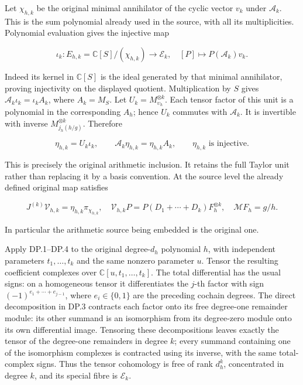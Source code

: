 \documentclass{article}
\begin{document}
Let \(\chi_{h,k}\) be the original minimal annihilator of the cyclic vector \(v_k\) under \(\mathcal A_k\). This is the sum polynomial already used in the source, with all its multiplicities. Polynomial evaluation gives the injective map

\[
\iota_k:E_{h,k}=\mathbb C[S]/(\chi_{h,k})\longrightarrow\mathcal E_k,
\quad [P]\longmapsto P(\mathcal A_k)v_k.
\tag{DP.25}
\]

Indeed its kernel in \(\mathbb C[S]\) is the ideal generated by that minimal annihilator, proving injectivity on the displayed quotient. Multiplication by \(S\) gives \(\mathcal A_k\iota_k=\iota_k A_k\), where \(A_k=M_S\). Let \(U_k=M_{\upsilon_h}^{\otimes k}\). Each tensor factor of this unit is a polynomial in the corresponding \(A_h\); hence \(U_k\) commutes with \(\mathcal A_k\). It is invertible with inverse \(M_{j_h(h/g)}^{\otimes k}\). Therefore

\[
\eta_{h,k}=U_k\iota_k,
\qquad \mathcal A_k\eta_{h,k}=\eta_{h,k}A_k,
\qquad \eta_{h,k}\text{ is injective}.
\tag{DP.26}
\]

This is precisely the original arithmetic inclusion. It retains the full Taylor unit rather than replacing it by a basis convention. At the source level the already defined original map satisfies

\[
J^{(k)}\mathcal V_{h,k}=\eta_{h,k}\pi_{\chi_{h,k}},
\quad \mathcal V_{h,k}P=P(D_1+\cdots+D_k)F_h^{\otimes k},
\quad \mathcal M F_h=g/h.
\tag{DP.27}
\]

In particular the arithmetic source being embedded is the original one.

Apply DP.1--DP.4 to the original degree-\(d_h\) polynomial \(h\), with independent parameters \(t_1,\ldots,t_k\) and the same nonzero parameter \(u\). Tensor the resulting coefficient complexes over \(\mathbb C[u,t_1,\ldots,t_k]\). The total differential has the usual signs: on a homogeneous tensor it differentiates the \(j\)-th factor with sign \((-1)^{e_1+\cdots+e_{j-1}}\), where \(e_i\in\{0,1\}\) are the preceding cochain degrees. The direct decomposition in DP.3 contracts each factor onto its free degree-one remainder module: its other summand is an isomorphism from its degree-zero module onto its own differential image. Tensoring these decompositions leaves exactly the tensor of the degree-one remainders in degree \(k\); every summand containing one of the isomorphism complexes is contracted using its inverse, with the same total-complex signs. Thus the tensor cohomology is free of rank \(d_h^k\), concentrated in degree \(k\), and its special fibre is \(\mathcal E_k\).
\end{document}
